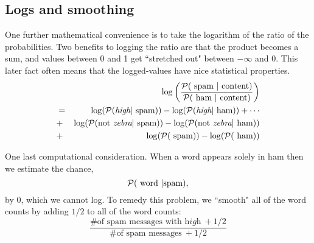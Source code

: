 \documentclass{article}
\begin{document}
\subsection*{Logs and smoothing}
One further mathematical convenience is to take the logarithm of the  
ratio of the probabilities.  Two benefits to logging the ratio are
that the product becomes a sum, and values between 0 and 1 get 
``stretched out" between $-\infty$ and 0.  This later fact often means
that the logged-values have nice statistical properties.
\begin{eqnarray*}
 &~& \log \left( \frac {{\cal P}(\textrm{ spam } | \textrm{ content} )}
 {{\cal P}(\textrm{ ham } | \textrm{ content} )} \right) \\
 &=&
  \log({\cal P}(\textit{high}|\textrm{ spam})) - \log({\cal P}(\textit{high}|\textrm{ ham} )) + \cdots \\
  &+&
  \log({\cal P}(\textrm{not }\textit{zebra}|\textrm{ spam})) - \log({\cal P}(\textrm{not }\textit{zebra}|\textrm{ ham} )) \\
 &+&
  \log({\cal P}(\textrm{ spam})) - \log({\cal P}(\textrm{ ham} ))
\end{eqnarray*}

One last computational consideration. When a word appears solely in ham
then we estimate the chance,
$$ {\cal P}(\textrm{ word }|\textrm{spam}),$$
by 0, which we cannot log.  To remedy this problem, we ``smooth" all
of the word counts by adding $1/2$ to all of the word counts: 
\begin{equation}
\frac {\# \textrm{of spam messages with }\textit{high} ~+1/2}
   {\# \textrm{of spam messages} ~+1/2}
\end{equation}
\end{document}
